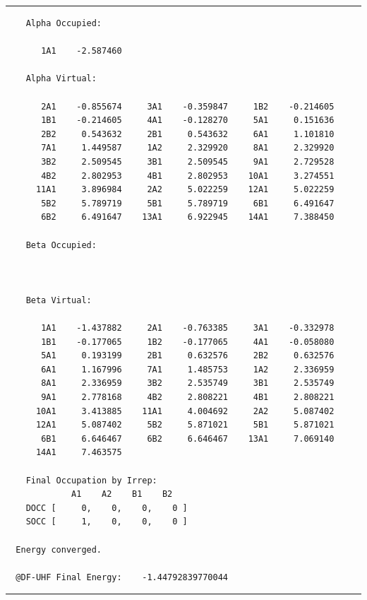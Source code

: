 \documentclass[portuguese,]{article}
\begin{document}
\begin{center}\rule{0.5\linewidth}{\linethickness}\end{center}

\begin{verbatim}
    Alpha Occupied:

       1A1    -2.587460

    Alpha Virtual:

       2A1    -0.855674     3A1    -0.359847     1B2    -0.214605
       1B1    -0.214605     4A1    -0.128270     5A1     0.151636
       2B2     0.543632     2B1     0.543632     6A1     1.101810
       7A1     1.449587     1A2     2.329920     8A1     2.329920
       3B2     2.509545     3B1     2.509545     9A1     2.729528
       4B2     2.802953     4B1     2.802953    10A1     3.274551
      11A1     3.896984     2A2     5.022259    12A1     5.022259
       5B2     5.789719     5B1     5.789719     6B1     6.491647
       6B2     6.491647    13A1     6.922945    14A1     7.388450

    Beta Occupied:



    Beta Virtual:

       1A1    -1.437882     2A1    -0.763385     3A1    -0.332978
       1B1    -0.177065     1B2    -0.177065     4A1    -0.058080
       5A1     0.193199     2B1     0.632576     2B2     0.632576
       6A1     1.167996     7A1     1.485753     1A2     2.336959
       8A1     2.336959     3B2     2.535749     3B1     2.535749
       9A1     2.778168     4B2     2.808221     4B1     2.808221
      10A1     3.413885    11A1     4.004692     2A2     5.087402
      12A1     5.087402     5B2     5.871021     5B1     5.871021
       6B1     6.646467     6B2     6.646467    13A1     7.069140
      14A1     7.463575

    Final Occupation by Irrep:
             A1    A2    B1    B2
    DOCC [     0,    0,    0,    0 ]
    SOCC [     1,    0,    0,    0 ]

  Energy converged.

  @DF-UHF Final Energy:    -1.44792839770044
\end{verbatim}

\begin{center}\rule{0.5\linewidth}{\linethickness}\end{center}
\end{document}
